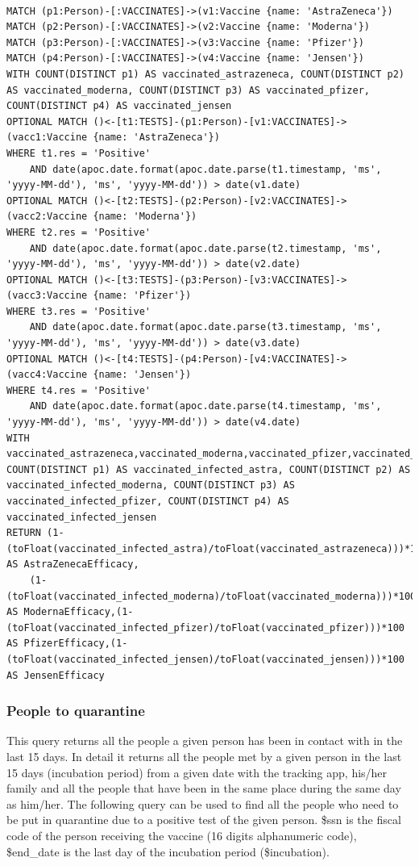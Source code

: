 \documentclass{article}
\begin{document}
\begin{lstlisting}[language=cypher, label=lst:cypher-example]

MATCH (p1:Person)-[:VACCINATES]->(v1:Vaccine {name: 'AstraZeneca'})
MATCH (p2:Person)-[:VACCINATES]->(v2:Vaccine {name: 'Moderna'})
MATCH (p3:Person)-[:VACCINATES]->(v3:Vaccine {name: 'Pfizer'})
MATCH (p4:Person)-[:VACCINATES]->(v4:Vaccine {name: 'Jensen'})
WITH COUNT(DISTINCT p1) AS vaccinated_astrazeneca, COUNT(DISTINCT p2) AS vaccinated_moderna, COUNT(DISTINCT p3) AS vaccinated_pfizer, COUNT(DISTINCT p4) AS vaccinated_jensen
OPTIONAL MATCH ()<-[t1:TESTS]-(p1:Person)-[v1:VACCINATES]->(vacc1:Vaccine {name: 'AstraZeneca'})
WHERE t1.res = 'Positive'
    AND date(apoc.date.format(apoc.date.parse(t1.timestamp, 'ms', 'yyyy-MM-dd'), 'ms', 'yyyy-MM-dd')) > date(v1.date)
OPTIONAL MATCH ()<-[t2:TESTS]-(p2:Person)-[v2:VACCINATES]->(vacc2:Vaccine {name: 'Moderna'})
WHERE t2.res = 'Positive'
    AND date(apoc.date.format(apoc.date.parse(t2.timestamp, 'ms', 'yyyy-MM-dd'), 'ms', 'yyyy-MM-dd')) > date(v2.date)
OPTIONAL MATCH ()<-[t3:TESTS]-(p3:Person)-[v3:VACCINATES]->(vacc3:Vaccine {name: 'Pfizer'})
WHERE t3.res = 'Positive'
    AND date(apoc.date.format(apoc.date.parse(t3.timestamp, 'ms', 'yyyy-MM-dd'), 'ms', 'yyyy-MM-dd')) > date(v3.date)
OPTIONAL MATCH ()<-[t4:TESTS]-(p4:Person)-[v4:VACCINATES]->(vacc4:Vaccine {name: 'Jensen'})
WHERE t4.res = 'Positive'
    AND date(apoc.date.format(apoc.date.parse(t4.timestamp, 'ms', 'yyyy-MM-dd'), 'ms', 'yyyy-MM-dd')) > date(v4.date)
WITH vaccinated_astrazeneca,vaccinated_moderna,vaccinated_pfizer,vaccinated_jensen, COUNT(DISTINCT p1) AS vaccinated_infected_astra, COUNT(DISTINCT p2) AS vaccinated_infected_moderna, COUNT(DISTINCT p3) AS vaccinated_infected_pfizer, COUNT(DISTINCT p4) AS vaccinated_infected_jensen
RETURN (1- (toFloat(vaccinated_infected_astra)/toFloat(vaccinated_astrazeneca)))*100 AS AstraZenecaEfficacy,
    (1- (toFloat(vaccinated_infected_moderna)/toFloat(vaccinated_moderna)))*100 AS ModernaEfficacy,(1- (toFloat(vaccinated_infected_pfizer)/toFloat(vaccinated_pfizer)))*100 AS PfizerEfficacy,(1- (toFloat(vaccinated_infected_jensen)/toFloat(vaccinated_jensen)))*100 AS JensenEfficacy
\end{lstlisting}
\newpage
\subsubsection{People to quarantine}
This query returns all the people a given person has been in contact with in the last 15 days. In detail it returns all the people met by a given person in the last 15 days (incubation period) from a given date with the tracking app, his/her family and all the people that have been in the same place during the same day as him/her.
The following query can be used to find all the people who need to be put in quarantine due to a positive test of the given person.
\$ssn is the fiscal code of the person receiving the vaccine (16 digits alphanumeric code), \$end\_date is the last day of the incubation period (\$incubation).
\end{document}
